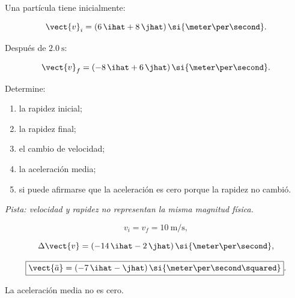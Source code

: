 \begin{ejercicio}
Una partícula tiene inicialmente:

\[
\vect{v}_i
=
(6\,\ihat+8\,\jhat)\,
\si{\meter\per\second}.
\]

Después de \(\SI{2.0}{\second}\):

\[
\vect{v}_f
=
(-8\,\ihat+6\,\jhat)\,
\si{\meter\per\second}.
\]

Determine:

\begin{enumerate}[label=\alph*)]
    \item la rapidez inicial;
    \item la rapidez final;
    \item el cambio de velocidad;
    \item la aceleración media;
    \item si puede afirmarse que la aceleración es cero porque la rapidez no cambió.
\end{enumerate}

\textit{Pista: velocidad y rapidez no representan la misma magnitud física.}
\end{ejercicio}

\begin{respuesta}
\[
v_i=v_f=\SI{10}{\meter\per\second},
\]

\[
\Delta\vect{v}
=
(-14\,\ihat-2\,\jhat)\,
\si{\meter\per\second},
\]

\[
\boxed{
\vect{\bar{a}}
=
(-7\,\ihat-\jhat)\,
\si{\meter\per\second\squared}
}.
\]

La aceleración media no es cero.
\end{respuesta}

